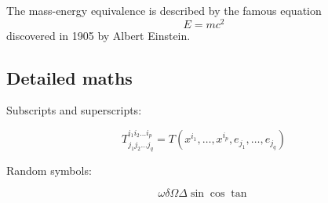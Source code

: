 \documentclass[12pt]{book}
\begin{document}
The mass-energy equivalence is described by the famous equation
\begin{equation}
    E=mc^2
\end{equation}
discovered in 1905 by Albert Einstein. 

\subsection{Detailed maths}

Subscripts and superscripts:

\[ T^{i_1 i_2 \dots i_p}_{j_1 j_2 \dots j_q} = T(x^{i_1},\dots,x^{i_p},e_{j_1},\dots,e_{j_q}) \]

Random symbols:

\[ \omega \delta \Omega \Delta \sin \cos \tan \]
\end{document}
